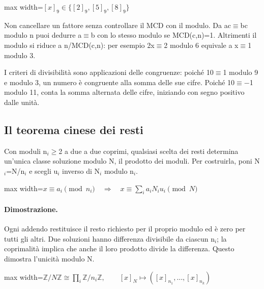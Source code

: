 \documentclass[a4paper,11pt]{article}
\begin{document}
\begin{center}\begin{adjustbox}{max width=\linewidth}$\displaystyle [x]_9\in\{[2]_9,[5]_9,[8]_9\}$\end{adjustbox}\end{center}

Non cancellare un fattore senza controllare il MCD con il modulo. Da ac$\equiv$bc modulo n puoi dedurre a$\equiv$b con lo stesso modulo se MCD(c,n)=1. Altrimenti il modulo si riduce a n/MCD(c,n): per esempio 2x$\equiv$2 modulo 6 equivale a x$\equiv$1 modulo 3.

I criteri di divisibilità sono applicazioni delle congruenze: poiché 10$\equiv$1 modulo 9 e modulo 3, un numero è congruente alla somma delle sue cifre. Poiché 10$\equiv$$-$1 modulo 11, conta la somma alternata delle cifre, iniziando con segno positivo dalle unità.

\subsection{Il teorema cinese dei resti}

Con moduli n$_{i}$$\ge$2 a due a due coprimi, qualsiasi scelta dei resti determina un’unica classe soluzione modulo N, il prodotto dei moduli. Per costruirla, poni N$_{i}$=N/n$_{i}$ e scegli u$_{i}$ inverso di N$_{i}$ modulo n$_{i}$.

\begin{center}\begin{adjustbox}{max width=\linewidth}$\displaystyle x\equiv a_i\pmod{n_i}\quad\Longrightarrow\quad x\equiv\sum_i a_iN_iu_i\pmod N$\end{adjustbox}\end{center}

\paragraph{Dimostrazione.} Ogni addendo restituisce il resto richiesto per il proprio modulo ed è zero per tutti gli altri. Due soluzioni hanno differenza divisibile da ciascun n$_{i}$; la coprimalità implica che anche il loro prodotto divide la differenza. Questo dimostra l’unicità modulo N.

\begin{center}\begin{adjustbox}{max width=\linewidth}$\displaystyle \mathbb Z/N\mathbb Z\cong\prod_i\mathbb Z/n_i\mathbb Z,\qquad[x]_N\mapsto([x]_{n_1},\ldots,[x]_{n_k})$\end{adjustbox}\end{center}
\end{document}
